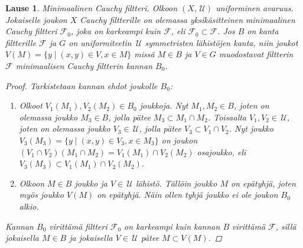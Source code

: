 \documentclass[12pt,a4paper,leqno]{report}
\newcommand{\U}{\,\mathcal{U}}
\newcommand{\F}{\mathcal{F}}
\theoremstyle{plain}
\newtheorem{lause}[equation]{Lause}
\theoremstyle{definition}
\newtheorem{maar}[equation]{Määritelmä}
\theoremstyle{remark}
\begin{document}
\begin{lause}
\emph{Minimaalinen Cauchy filtteri.} 
Olkoon $(X,\U)$ uniforminen avaruus. 
Jokaiselle joukon $X$ Cauchy filtterille on olemassa yksikäsitteinen 
minimaalinen Cauchy filtteri $\F_0$, joka on karkeampi kuin $\F$, 
eli $\F_0\subset \F$. 
Jos $B$ on kanta filtterille $\F$ ja $G$ on uniformiteetin $\U$ symmetristen lähistöjen kanta, 
niin joukot $V(M)=\{ y\mid (x,y)\in V,x\in M \}$ missä $M\in B$ ja $V\in G$ muodostavat 
filtterin $\F$ minimaalisen Cauchy filtterin kannan $B_0$. 
\begin{proof}
Tarkistetaan kannan ehdot joukolle $B_0$:
\begin{enumerate}
\item Olkoot $V_1(M_1),V_2(M_2)\in B_0$ joukkoja. 
Nyt $M_1,M_2\in B$, joten on olemassa joukko $M_3\in B$, 
jolla pätee $M_3\subset M_1\cap M_2$. 
Toisaalta $V_1,V_2\in \U$, joten on olemassa joukko $V_3\in\U$, 
jolla pätee $V_3\subset V_1\cap V_2$. 
Nyt joukko $ V_3(M_3)=\{ y\mid (x,y)\in V_3, x\in M_3 \}$ on joukon 
$(V_1\cap V_2)(M_1\cap M_2)= V_1(M_1)\cap V_2(M_2)$ osajoukko, 
eli $ V_3(M_3)\subset V_1(M_1)\cap V_2(M_2)$.
\item Olkoon $M\in B$ joukko ja $V\in \U$ lähistö. 
Tällöin joukko $M$ on epätyhjä, joten myös joukko $V(M)$ on epätyhjä. 
Näin ollen tyhjä joukko ei ole joukon $B_0$ alkio.
\end{enumerate}
Kannan $B_0$ virittämä filtteri $\F_0$ on karkeampi kuin kannan $B$ virittämä $\F$, 
sillä jokaisella $M\in B$ ja jokaisella $V\in \U$ pätee $M\subset V(M)$. 
\end{proof}
\end{lause}
%
%
%
\end{document}
